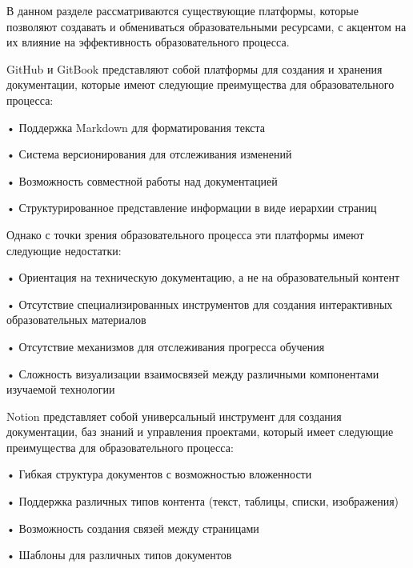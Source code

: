 \subtitlespace

{\gostFont

  \par \redline В данном разделе рассматриваются существующие платформы, которые позволяют создавать и обмениваться образовательными ресурсами, с акцентом на их влияние на эффективность образовательного процесса.

  \par \redline GitHub и GitBook представляют собой платформы для создания и хранения документации, которые имеют следующие преимущества для образовательного процесса:
  
  \par \redline • Поддержка Markdown для форматирования текста
  \par \redline • Система версионирования для отслеживания изменений
  \par \redline • Возможность совместной работы над документацией
  \par \redline • Структурированное представление информации в виде иерархии страниц
  
  \par \redline Однако с точки зрения образовательного процесса эти платформы имеют следующие недостатки:
  
  \par \redline • Ориентация на техническую документацию, а не на образовательный контент
  \par \redline • Отсутствие специализированных инструментов для создания интерактивных образовательных материалов
  \par \redline • Отсутствие механизмов для отслеживания прогресса обучения
  \par \redline • Сложность визуализации взаимосвязей между различными компонентами изучаемой технологии

  \par \redline Notion представляет собой универсальный инструмент для создания документации, баз знаний и управления проектами, который имеет следующие преимущества для образовательного процесса:
  
  \par \redline • Гибкая структура документов с возможностью вложенности
  \par \redline • Поддержка различных типов контента (текст, таблицы, списки, изображения)
  \par \redline • Возможность создания связей между страницами
  \par \redline • Шаблоны для различных типов документов
  
}
